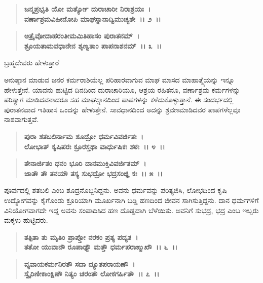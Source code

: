 \begin{verse}
\textbf{ಜನ್ಮಪ್ರಭೃತಿ ಯೋ ಮರ್ತ್ಯೋ ದುರಾಚಾರೀ ನಿರಾಶ್ರಯಃ~।}\\\textbf{ವರ್ಣಾಶ್ರಮವಿಹೀನೋಪಿ ಮಾಘಸ್ನಾನಾದ್ವಿಮುಚ್ಯತೇ~।। ೨~।।}
\end{verse}

\begin{verse}
\textbf{ಅತ್ರೈವೋದಾಹರಂತೀಮಮಿತಿಹಾಸಂ ಪುರಾತನಮ್~।}\\\textbf{ಶ್ರೂಯತಾಮವಧಾನೇನ ಶೃಣ್ವತಾಂ ಪಾಪನಾಶನಮ್~।। ೩~।। }
\end{verse}

\begin{flushleft}
ಬ್ರಹ್ಮದೇವರು ಹೇಳುತ್ತಾರೆ\enginline{-}
\end{flushleft}

ಅನುಷ್ಠಾನ ಮಾಡುವ ಜನರ ಕರ್ಮರಾಶಿಯೆಲ್ಲ ಪರಿಹಾರವಾಗುವ ಮಾಘ ಮಾಸದ ಮಾಹಾತ್ಮ್ಯೆಯನ್ನು ಇನ್ನೂ ಹೇಳುತ್ತೇನೆ. ಯಾವನು ಹುಟ್ಟಿದ ದಿನದಿಂದ ದುರಾಚಾರಿಯೂ, ಆಶ್ರಯ ರಹಿತನೂ, ವರ್ಣಾಶ್ರಮ ಕರ್ಮಗಳನ್ನು ಪರಿತ್ಯಾಗ ಮಾಡಿದವನಾದರೂ ಸಹ ಮಾಘಸ್ನಾನದಿಂದ ಪಾಪಗಳನ್ನು ಕಳೆದುಕೊಳ್ಳುತ್ತಾನೆ. ಈ ಸಂದರ್ಭದಲ್ಲಿ ಪುರಾತನವಾದ ಇತಿಹಾಸ ಒಂದನ್ನು ಹೇಳುತ್ತೇನೆ. ಸಾವಧಾನದಿಂದ ಅದನ್ನು ಶ್ರವಣಮಾಡಿದವರ ಪಾಪಗಳೆಲ್ಲವೂ ನಾಶವಾಗುತ್ತವೆ.

\begin{verse}
\textbf{ಪುರಾ ಶತಬಲಿರ್ನಾಮ ಶೂದ್ರೋ ಧರ್ಮವಿವರ್ಜಿತಃ~।}\\\textbf{ಲೋಭಾತ್ ಕೃಷಿಪರಃ ಕ್ರೂರಸ್ತಥಾ ವಾರ್ಧುಷಿಕಃ ಶಠಃ~।। ೪~।। }
\end{verse}

\begin{verse}
\textbf{ತೇನಾರ್ಜಿತಂ ಧನಂ ಭೂರಿ ದಾನಮುಕ್ತಿವಿವರ್ಜಿತಮ್~।}\\\textbf{ಜಾತೌ ತೌ ತನಯೌ ತಸ್ಯ ಸುಭದ್ರೋ ಭದ್ರಸಂಜ್ಞಿ ಕಃ~।। ೫~।।}
\end{verse}

ಪೂರ್ವದಲ್ಲಿ ಶತಬಲಿ ಎಂಬ ಶೂದ್ರನೊಬ್ಬನಿದ್ದನು. ಅವನು ಧರ್ಮವನ್ನು ಪರಿತ್ಯಜಿಸಿ, ಲೋಭದಿಂದ ಕೃಷಿ ಉದ್ಯೋಗವನ್ನು ಕೈಗೊಂಡು ಕ್ರೂರಿಯಾಗಿ ಮೂರ್ಖನಾಗಿ ಬಡ್ಡಿ ಹಣದಿಂದ ಜೀವನ ಸಾಗಿಸುತ್ತಿದ್ದನು. ದಾನ ಧರ್ಮಗಳಿಗೆ ವಿನಿಯೋಗವಾಗದೇ ಇದ್ದ ಅವನು ಸಂಪಾದಿಸಿದ ಹಣ ದೊಡ್ಡದಾಗಿ ಬೆಳೆಯಿತು. ಅವನಿಗೆ ಸುಭದ್ರ, ಭದ್ರ ಎಂಬ ಇಬ್ಬರು ಮಕ್ಕಳು ಹುಟ್ಟಿದರು.

\begin{verse}
\textbf{ತತ್ಪಿತಾ ತು ಮೃತಿಂ ಪ್ರಾಪ್ತೋ ನರಕಂ ಪ್ರತ್ಯ ಪದ್ಯತ~।}\\\textbf{ತತೋ ಯುವಾನೌ ರೂಪಾಢ್ಯೌ ಮತ್ತೌ ಧರ್ಮಪರಾಙ್ಮುಖೌ~।। ೬~।। }
\end{verse}

\begin{verse}
\textbf{ವ್ಯವಾಯಕರ್ಮನಿರತೌ ಸದಾ ದ್ಯೂತಪರಾಯಣೌ~।}\\\textbf{ಸ್ವೈರಿಣೀಕಾಂಕ್ಷಿಣೌ ನಿತ್ಯಂ ಚರಂತೌ ಲೋಕಗರ್ಹಿತೌ~।। ೭~।।}
\end{verse}


